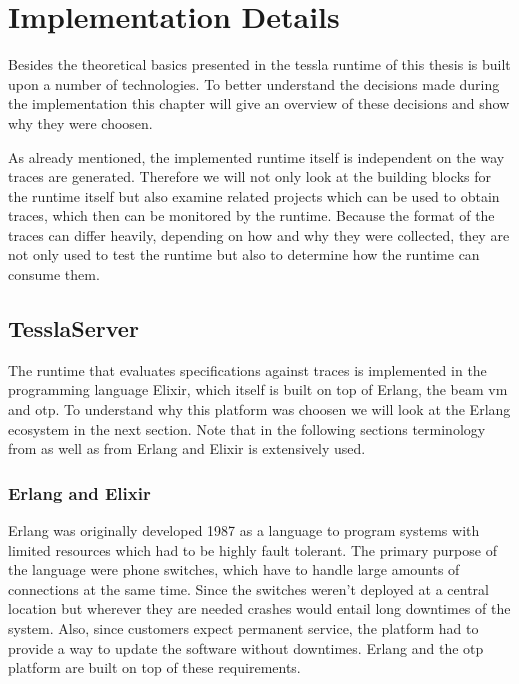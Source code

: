 %
\chapter{Implementation Details}
\label{sec:implementation}

Besides the theoretical basics presented in  the \gls{tessla} runtime of this thesis is built upon a number of technologies.
To better understand the decisions made during the implementation this chapter will give an overview of these decisions and show why they were choosen.

As already mentioned, the implemented runtime itself is independent on the way traces are generated.
Therefore we will not only look at the building blocks for the runtime itself but also examine related projects which can be used to obtain traces, which then can be monitored by the runtime.
Because the format of the traces can differ heavily, depending on how and why they were collected, they are not only used to test the runtime but also to determine how the runtime can consume them.

\section{TesslaServer}
\label{sec:implementation:tesslaserver}

The runtime that evaluates specifications against traces is implemented in the programming language Elixir, which itself is built on top of Erlang, the \gls{beam} \gls{vm} and \gls{otp}.
To understand why this platform was choosen we will look at the Erlang ecosystem in the next section.
Note that in the following sections terminology from  as well as from Erlang and Elixir is extensively used.

\subsection{Erlang and Elixir}
\label{sec:implementation:tesslaserver:erlang_elixir}

Erlang was originally developed 1987 as a language to program systems with limited resources which had to be highly fault tolerant.
The primary purpose of the language were phone switches, which have to handle large amounts of connections at the same time.
Since the switches weren't deployed at a central location but wherever they are needed crashes would entail long downtimes of the system.
Also, since customers expect permanent service, the platform had to provide a way to update the software without downtimes.
Erlang and the \gls{otp} platform are built on top of these requirements.

